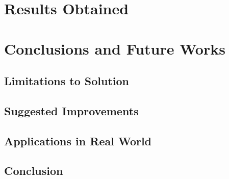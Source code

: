 \documentclass{llncs}
\begin{document}
\section{Results Obtained}

\section{Conclusions and Future Works}

\subsection{Limitations to Solution}

\subsection{Suggested Improvements}

\subsection{Applications in Real World}

\subsection{Conclusion}
\end{document}

